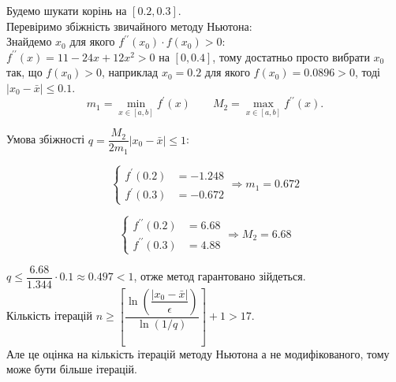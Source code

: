 Будемо шукати корінь на $[0.2, 0.3]$. \\

Перевіримо збіжність звичайного методу Ньютона: \\

Знайдемо $x_0$ для якого $f^{\prime\prime}(x_0)\cdot f(x_0) > 0$: \\

$f^{\prime\prime}(x) = 11 - 24 x + 12 x^2 > 0$ на $[0, 0.4]$, тому достатньо просто вибрати $x_0$ так, що $f(x_0) > 0$, наприклад $x_0 = 0.2$ для якого $f(x_0) = 0.0896 > 0$, тоді $|x_0 - \bar x| \le 0.1$. \\

\[ m_1 = \min_{x \in [a, b]} f^\prime(x) \qquad M_2 = \max_{x \in [a, b]} f^{\prime\prime}(x). \]

Умова збіжності $q = \dfrac{M_2}{2m_1} |x_0 - \bar x| \le 1$:

\begin{equation*}
    \left\{
        \begin{aligned}
            f^\prime(0.2) &= -1.248 \\
            f^\prime(0.3) &= -0.672
        \end{aligned}
    \right.
    \Rightarrow m_1 = 0.672
\end{equation*}

\begin{equation*}
    \left\{
        \begin{aligned}
            f^{\prime\prime}(0.2) &= 6.68 \\
            f^{\prime\prime}(0.3) &= 4.88
        \end{aligned}
    \right.
    \Rightarrow M_2 = 6.68
\end{equation*}

$q \le \dfrac{6.68}{1.344} \cdot 0.1 \approx 0.497 < 1$, отже метод гарантовано зійдеться. \\

Кількість ітерацій $n \ge \left[ \dfrac{\ln \left(\dfrac{|x_0 - \bar x|}{\epsilon}\right)}{\ln (1/q)} \right] + 1 > 17$. \\

Але це оцінка на кількість ітерацій методу Ньютона а не модифікованого, тому може бути більше ітерацій. \\


